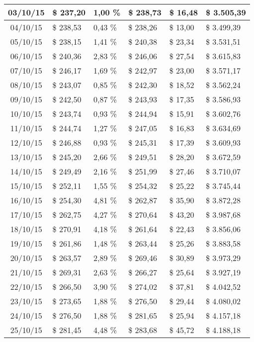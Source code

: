 \begin{small}
\begin{longtable}{|c|l|l|l|l|l|}
03/10/15 & \$ 237,20 & 1,00 \% & \$ 238,73 & \$ 16,48 & \$ 3.505,39 \\ \hline
04/10/15 & \$ 238,53 & 0,43 \% & \$ 238,26 & \$ 13,00 & \$ 3.499,39 \\ \hline
05/10/15 & \$ 238,15 & 1,41 \% & \$ 240,38 & \$ 23,34 & \$ 3.531,51 \\ \hline
06/10/15 & \$ 240,36 & 2,83 \% & \$ 246,06 & \$ 27,54 & \$ 3.615,83 \\ \hline
07/10/15 & \$ 246,17 & 1,69 \% & \$ 242,97 & \$ 23,00 & \$ 3.571,17 \\ \hline
08/10/15 & \$ 243,07 & 0,85 \% & \$ 242,30 & \$ 18,52 & \$ 3.562,24 \\ \hline
09/10/15 & \$ 242,50 & 0,87 \% & \$ 243,93 & \$ 17,35 & \$ 3.586,93 \\ \hline
10/10/15 & \$ 243,74 & 0,93 \% & \$ 244,94 & \$ 15,91 & \$ 3.602,76 \\ \hline
11/10/15 & \$ 244,74 & 1,27 \% & \$ 247,05 & \$ 16,83 & \$ 3.634,69 \\ \hline
12/10/15 & \$ 246,88 & 0,93 \% & \$ 245,31 & \$ 17,39 & \$ 3.609,93 \\ \hline
13/10/15 & \$ 245,20 & 2,66 \% & \$ 249,51 & \$ 28,20 & \$ 3.672,59 \\ \hline
14/10/15 & \$ 249,49 & 2,16 \% & \$ 251,99 & \$ 27,46 & \$ 3.710,07 \\ \hline
15/10/15 & \$ 252,11 & 1,55 \% & \$ 254,32 & \$ 25,22 & \$ 3.745,44 \\ \hline
16/10/15 & \$ 254,30 & 4,81 \% & \$ 262,87 & \$ 35,90 & \$ 3.872,28 \\ \hline
17/10/15 & \$ 262,75 & 4,27 \% & \$ 270,64 & \$ 43,20 & \$ 3.987,68 \\ \hline
18/10/15 & \$ 270,91 & 4,18 \% & \$ 261,64 & \$ 22,43 & \$ 3.856,06 \\ \hline
19/10/15 & \$ 261,86 & 1,48 \% & \$ 263,44 & \$ 25,26 & \$ 3.883,58 \\ \hline
20/10/15 & \$ 263,57 & 2,89 \% & \$ 269,46 & \$ 30,89 & \$ 3.973,29 \\ \hline
21/10/15 & \$ 269,31 & 2,63 \% & \$ 266,27 & \$ 25,64 & \$ 3.927,19 \\ \hline
22/10/15 & \$ 266,50 & 3,90 \% & \$ 274,02 & \$ 37,81 & \$ 4.042,52 \\ \hline
23/10/15 & \$ 273,65 & 1,88 \% & \$ 276,50 & \$ 29,44 & \$ 4.080,02 \\ \hline
24/10/15 & \$ 276,50 & 1,88 \% & \$ 281,65 & \$ 25,94 & \$ 4.157,18 \\ \hline
25/10/15 & \$ 281,45 & 4,48 \% & \$ 283,68 & \$ 45,72 & \$ 4.188,18 \\ \hline

\end{longtable}
\end{small}
